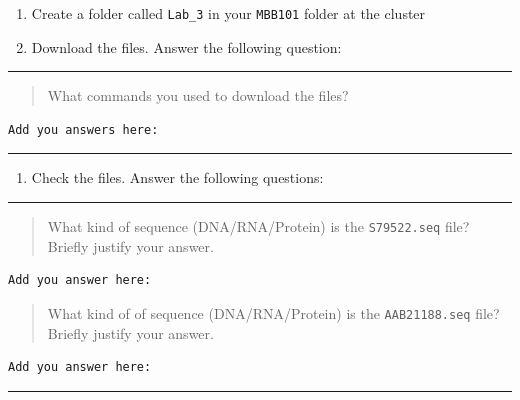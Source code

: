 \documentclass[
]{book}
\providecommand{\tightlist}{%
  \setlength{\itemsep}{0pt}\setlength{\parskip}{0pt}}
\begin{document}
\begin{enumerate}
\def\labelenumi{\arabic{enumi}.}
\tightlist
\item
  Create a folder called \texttt{Lab\_3} in your \texttt{MBB101} folder at the cluster
\item
  Download the files. Answer the following question:
\end{enumerate}

\begin{center}\rule{0.5\linewidth}{0.5pt}\end{center}

\begin{quote}
What commands you used to download the files?
\end{quote}

\begin{verbatim}
Add you answers here:

\end{verbatim}

\begin{center}\rule{0.5\linewidth}{0.5pt}\end{center}

\begin{enumerate}
\def\labelenumi{\arabic{enumi}.}
\setcounter{enumi}{2}
\tightlist
\item
  Check the files. Answer the following questions:
\end{enumerate}

\begin{center}\rule{0.5\linewidth}{0.5pt}\end{center}

\begin{quote}
What kind of sequence (DNA/RNA/Protein) is the \texttt{S79522.seq} file? Briefly justify your answer.
\end{quote}

\begin{verbatim}
Add you answer here:
\end{verbatim}

\begin{quote}
What kind of of sequence (DNA/RNA/Protein) is the \texttt{AAB21188.seq} file? Briefly justify your answer.
\end{quote}

\begin{verbatim}
Add you answer here:
\end{verbatim}

\begin{center}\rule{0.5\linewidth}{0.5pt}\end{center}
\end{document}
